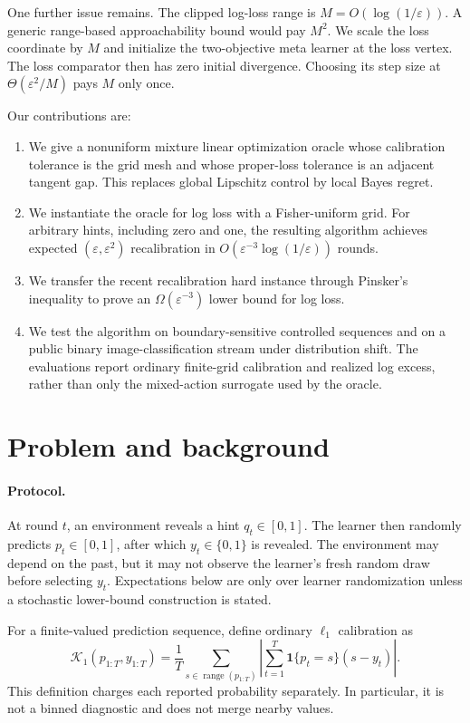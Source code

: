 \documentclass{article}
\newcommand{\calK}{\mathcal{K}}
\begin{document}
One further issue remains. The clipped log-loss range is $M=O(\log(1/\varepsilon))$. A generic range-based approachability bound would pay $M^2$. We scale the loss coordinate by $M$ and initialize the two-objective meta learner at the loss vertex. The loss comparator then has zero initial divergence. Choosing its step size at $\Theta(\varepsilon^2/M)$ pays $M$ only once.

Our contributions are:
\begin{enumerate}
  \item We give a nonuniform mixture linear optimization oracle whose
calibration tolerance is the grid mesh and whose proper-loss tolerance is an adjacent tangent gap. This replaces global Lipschitz control by local Bayes regret.
  \item We instantiate the oracle for log loss with a Fisher-uniform grid.
For arbitrary hints, including zero and one, the resulting algorithm achieves expected $(\varepsilon,\varepsilon^2)$ recalibration in $O(\varepsilon^{-3}\log(1/\varepsilon))$ rounds.
  \item We transfer the recent recalibration hard instance through Pinsker's
inequality to prove an $\Omega(\varepsilon^{-3})$ lower bound for log loss.
  \item We test the algorithm on boundary-sensitive controlled sequences and
on a public binary image-classification stream under distribution shift. The evaluations report ordinary finite-grid calibration and realized log excess, rather than only the mixed-action surrogate used by the oracle.
\end{enumerate}

\section{Problem and background}
\label{sec:problem}

\paragraph{Protocol.}
At round $t$, an environment reveals a hint $q_t\in[0,1]$. The learner then randomly predicts $p_t\in[0,1]$, after which $y_t\in\{0,1\}$ is revealed. The environment may depend on the past, but it may not observe the learner's fresh random draw before selecting $y_t$. Expectations below are only over learner randomization unless a stochastic lower-bound construction is stated.

For a finite-valued prediction sequence, define ordinary $\ell_1$ calibration as
\begin{equation}
  \calK_1(p_{1:T},y_{1:T})
  =\frac1T\sum_{s\in\operatorname{range}(p_{1:T})}
  \left|\sum_{t=1}^T \mathbf{1}\{p_t=s\}(s-y_t)\right|.
  \label{eq:k1}
\end{equation}
This definition charges each reported probability separately. In particular, it is not a binned diagnostic and does not merge nearby values.
\end{document}
